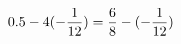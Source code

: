\documentclass[preview]{standalone}
\begin{document}
\begin{align*}
\special{dvisvgm:raw <g id='unique000'>}0.5 - 4(- \frac{1}{12}) = \frac{6}{8} - (- \frac{1}{12})\special{dvisvgm:raw </g>}
\end{align*}
\end{document}
